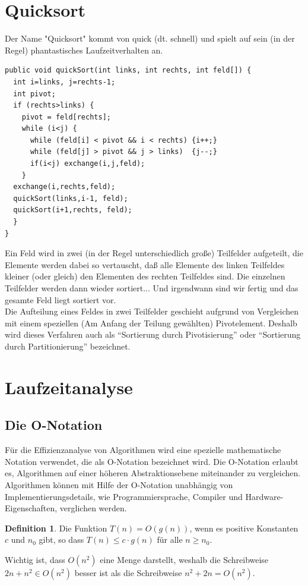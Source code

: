 \documentclass[a4paper,10pt,DIV9, BCOR12mm, oneside,openright,openbib]{scrreprt}
\theoremstyle{definition}
\newtheorem{mydef}{Definition}[section]
\theoremstyle{plain}
\begin{document}
\section{Quicksort}
Der Name "Quicksort" kommt von quick (dt. schnell) und spielt auf sein (in der Regel) phantastisches Laufzeitverhalten an.
\begin{lstlisting}[caption=Quicksort mit Privot-Element rechts]
public void quickSort(int links, int rechts, int feld[]) { 
  int i=links, j=rechts-1; 
  int pivot; 
  if (rechts>links) { 
    pivot = feld[rechts]; 
    while (i<j) { 
      while (feld[i] < pivot && i < rechts) {i++;} 
      while (feld[j] > pivot && j > links)  {j--;} 
      if(i<j) exchange(i,j,feld); 
    } 
  exchange(i,rechts,feld); 
  quickSort(links,i-1, feld); 
  quickSort(i+1,rechts, feld); 
  } 
} 
\end{lstlisting}
Ein Feld wird in zwei (in der Regel unterschiedlich große) Teilfelder aufgeteilt, die Elemente werden dabei so vertauscht, daß alle Elemente des linken Teilfeldes kleiner (oder gleich) den Elementen des rechten Teilfeldes sind. Die einzelnen Teilfelder werden dann wieder sortiert... Und irgendwann sind wir fertig und das gesamte Feld liegt sortiert vor.\\
Die Aufteilung eines Feldes in zwei Teilfelder geschieht aufgrund von Vergleichen mit einem speziellen (Am Anfang der Teilung gewählten) Pivotelement. Deshalb wird dieses Verfahren auch als ``Sortierung durch Pivotisierung'' oder ``Sortierung durch Partitionierung'' bezeichnet.




\section{Laufzeitanalyse}
\subsection{Die O-Notation}
Für die Effizienzanalyse von Algorithmen wird eine spezielle mathematische Notation verwendet, die als O-Notation bezeichnet wird. Die O-Notation erlaubt es, Algorithmen auf einer höheren Abstraktionsebene miteinander zu vergleichen. Algorithmen können mit Hilfe der O-Notation unabhängig von Implementierungsdetails, wie Programmiersprache, Compiler und Hardware-Eigenschaften, verglichen werden.
\begin{mydef}
 Die Funktion $T(n) = O(g(n))$, wenn es positive Konstanten $c$ und $n_{0}$ gibt, so dass $T(n) \leq c \cdot g(n)$ für alle $n \geq n_{0}$.
\end{mydef}
Wichtig ist, dass  $O(n^2)$  eine Menge darstellt, weshalb die Schreibweise $2n + n^2 \in O(n^2)$ besser ist als die Schreibweise $n^2 + 2n = O(n^2)$.
\end{document}
